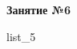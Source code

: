 \documentclass[12pt, a4paper]{article}
\begin{document}
	\begin{center}
		\large
		\textbf{Занятие №6}
	\end{center}
	{list_5}
\end{document}
